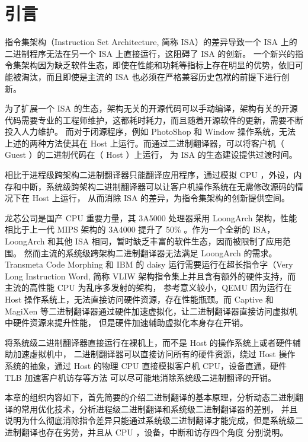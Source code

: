 \chapter{引言}\label{chap:introduction}

指令集架构（Instruction Set Architecture, 简称 ISA）的差异导致一个 ISA 上的二进制程序无法在另一个 ISA 上直接运行，这阻碍了 ISA 的创新。
一个新兴的指令集架构因为缺乏软件生态，即使在性能和功耗等指标上存在明显的优势，依旧可能被淘汰，而且即使是主流的 ISA 也必须在严格兼容历史包袱的前提下进行创新。

为了扩展一个 ISA 的生态，架构无关的开源代码可以手动编译，架构有关的开源代码需要专业的工程师维护，这都耗时耗力，而且随着开源软件的更新，需要不断投入人力维护。
而对于闭源程序，例如 PhotoShop 和 Window 操作系统，无法上述的两种方法使其在 Host 上运行。而通过二进制翻译器，可以将客户机（ Guest ）的二进制代码在（ Host ）上运行，
为 ISA 的生态建设提供过渡时间。

相比于进程级跨架构二进制翻译器只能翻译应用程序，通过模拟 CPU ，外设，内存和中断，系统级跨架构二进制翻译器可以让客户机操作系统在无需修改源码的情况下在 Host 上运行，
从而消除 ISA 的差异，为指令集架构的创新提供空间。

龙芯公司是国产 CPU 重要力量，其 3A5000 \citep{3A5000/3B5000} 处理器采用 LoongArch \citep{LoongArch} 架构，性能
相比于上一代 MIPS 架构的 3A4000 提升了 50\% \citep{3A5000Release}。作为一个全新的 ISA，LoongArch 和其他 ISA 相同，暂时缺乏丰富的软件生态，因而被限制了应用范围。
然而主流的系统级跨架构二进制翻译器无法满足 LoongArch 的需求。Transmeta Code Morphing 和 IBM 的 daisy 运行需要运行在超长指令字（Very Long Instruction Word, 简称 VLIW 架构指令集上并且含有额外的硬件支持，而主流的高性能 CPU 为乱序多发射的架构，
参考意义较小，QEMU 因为运行在 Host 操作系统上，无法直接访问硬件资源，存在性能瓶颈。而 Captive 和 MagiXen 等二进制翻译器通过硬件加速虚拟化，让二进制翻译器直接访问虚拟机中硬件资源来提升性能，
但是硬件加速辅助虚拟化本身存在开销。

将系统级二进制翻译器直接运行在裸机上，而不是 Host 的操作系统上或者硬件辅助加速虚拟机中，
二进制翻译器可以直接访问所有的硬件资源，绕过 Host 操作系统的抽象，通过 Host 的物理 CPU 直接模拟客户机 CPU，设备直通，硬件 TLB 加速客户机访存等方法
可以尽可能地消除系统级二进制翻译的开销。

本章的组织内容如下，首先简要的介绍二进制翻译的基本原理，分析动态二进制翻译的常用优化技术，分析进程级二进制翻译和系统级二进制翻译器的差别，
并且说明为什么彻底消除指令差异只能通过系统级二进制翻译才能完成，但是系统级二进制翻译也存在劣势，并且从 CPU ，设备，中断和访存四个角度
分别说明。

